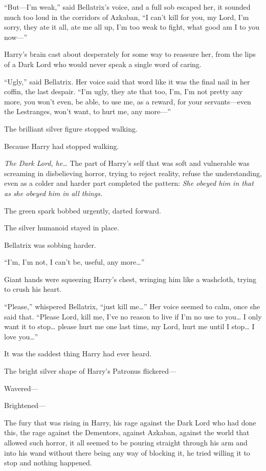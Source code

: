 ``But---I'm weak,'' said Bellatrix's voice, and a full sob escaped her,
it sounded much too loud in the corridors of Azkaban, ``I can't kill for
you, my Lord, I'm sorry, they ate it all, ate me all up, I'm too weak to
fight, what good am I to you now---''

Harry's brain cast about desperately for some way to reassure her, from
the lips of a Dark Lord who would never speak a single word of caring.

``Ugly,'' said Bellatrix. Her voice said that word like it was the final
nail in her coffin, the last despair. ``I'm ugly, they ate that too,
I'm, I'm not pretty any more, you won't even, be able, to use me, as a
reward, for your servants---even the Lestranges, won't want, to hurt me,
any more---''

The brilliant silver figure stopped walking.

Because Harry had stopped walking.

\emph{The Dark Lord, he\ldots{}} The part of Harry's self that was soft
and vulnerable was screaming in disbelieving horror, trying to reject
reality, refuse the understanding, even as a colder and harder part
completed the pattern: \emph{She obeyed him in that as she obeyed him in
all things.}

The green spark bobbed urgently, darted forward.

The silver humanoid stayed in place.

Bellatrix was sobbing harder.

``I'm, I'm not, I can't be, useful, any more\ldots{}''

Giant hands were squeezing Harry's chest, wringing him like a washcloth,
trying to crush his heart.

``Please,'' whispered Bellatrix, ``just kill me\ldots{}'' Her voice
seemed to calm, once she said that. ``Please Lord, kill me, I've no
reason to live if I'm no use to you\ldots{} I only want it to
stop\ldots{} please hurt me one last time, my Lord, hurt me until I
stop\ldots{} I love you\ldots{}''

It was the saddest thing Harry had ever heard.

The bright silver shape of Harry's Patronus flickered---

Wavered---

Brightened---

The fury that was rising in Harry, his rage against the Dark Lord who
had done this, the rage against the Dementors, against Azkaban, against
the world that allowed such horror, it all seemed to be pouring straight
through his arm and into his wand without there being any way of
blocking it, he tried willing it to stop and nothing happened.

